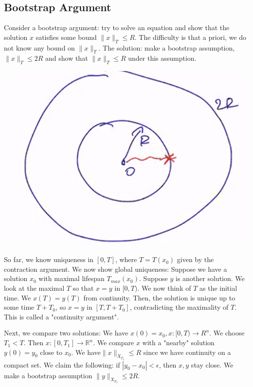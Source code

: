 \documentclass[12pt]{scrartcl}
\newcommand{\R}{\mathbb{R}}
\begin{document}
\subsection{Bootstrap Argument}
Consider a bootstrap argument:  try to solve an equation and show that the solution $x$ satisfies some bound $\|x\|_T \le R$.  The difficulty is that a priori, we do not know any bound on $\|x\|_T$.  The solution:  make a bootstrap assumption, $\|x\|_T \le 2R$ and show that $\|x \|_T \le R$ under this assumption.  
\begin{center}
\includegraphics[scale=0.5]{bootstrap.png}
\end{center}

So far, we know uniqueness in $[0, T]$, where $T=T(x_0)$ given by the contraction argument.  We now show global uniqueness:  Suppose we have a solution $x_0$ with maximal lifespan $T_{max}(x_0)$.   Suppose $y$ is another solution.  We look at the maximal $T$ so that $x = y$ in $[0, T)$.  We now think of $T$ as the initial time.  We $x(T) = y(T)$ from continuity. Then, the solution is unique up to some time $T+T_0$, so $x = y$ in $[T, T+T_0]$, contradicting the maximality of $T$.  This is called a "continuity argument".

Next, we compare two solutions:  We have $x(0) = x_0, x: [0, T) \rightarrow R^n$.  We choose $T_1 < T$.  Then $x: [0, T_1] \rightarrow \R^n$.  We compare $x$ with a "nearby" solution $y(0) = y_0$ close to $x_0$.  We have$\|x\|_{X_{T_1}} \le R$ since we have continuity on a compact set.  We claim the following: if $|y_0 - x_0| < \epsilon$, then $x, y$ stay close.  We make a bootstrap assumption $\|y\|_{X_{T_1}} \le 2R$.  
\end{document}
